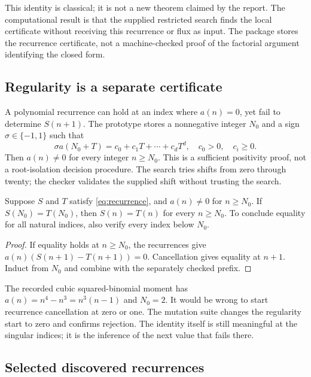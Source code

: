 This identity is classical; it is not a new theorem claimed by the report. The computational result is that the supplied restricted search finds the local certificate without receiving this recurrence or flux as input. The package stores the recurrence certificate, not a machine-checked proof of the factorial argument identifying the closed form.

\subsection{Regularity is a separate certificate}

A polynomial recurrence can hold at an index where $a(n)=0$, yet fail to determine $S(n+1)$. The prototype stores a nonnegative integer $N_0$ and a sign $\sigma\in\{-1,1\}$ such that
\begin{equation}
 \sigma a(N_0+T)=c_0+c_1T+\cdots+c_dT^d,
 \quad c_0>0,\quad c_i\ge0.
 \label{eq:regularity}
\end{equation}
Then $a(n)\ne0$ for every integer $n\ge N_0$. This is a sufficient positivity proof, not a root-isolation decision procedure. The search tries shifts from zero through twenty; the checker validates the supplied shift without trusting the search.

\begin{proposition}
Suppose $S$ and $T$ satisfy \eqref{eq:recurrence}, and $a(n)\ne0$ for $n\ge N_0$. If $S(N_0)=T(N_0)$, then $S(n)=T(n)$ for every $n\ge N_0$. To conclude equality for all natural indices, also verify every index below $N_0$.
\end{proposition}
\begin{proof}
If equality holds at $n\ge N_0$, the recurrences give $a(n)(S(n+1)-T(n+1))=0$. Cancellation gives equality at $n+1$. Induct from $N_0$ and combine with the separately checked prefix.
\end{proof}

The recorded cubic squared-binomial moment has $a(n)=n^4-n^3=n^3(n-1)$ and $N_0=2$. It would be wrong to start recurrence cancellation at zero or one. The mutation suite changes the regularity start to zero and confirms rejection. The identity itself is still meaningful at the singular indices; it is the inference of the next value that fails there.

\subsection{Selected discovered recurrences}

